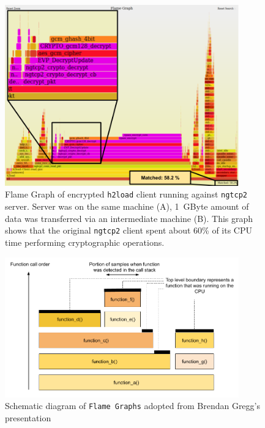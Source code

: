 \documentclass[12pt,a4paper]{report}
\begin{document}
    \begin{figure}[H]
    \centering
    \includegraphics[width=0.9\textwidth]{figs/zoomed_encrypted_flame_graph_1GByte_h2load.png}
    \caption[Flame Graph of \texttt{h2load} client running against \texttt{ngtcp2} server]{Flame Graph of encrypted \texttt{h2load} client running against \texttt{ngtcp2} server.
    Server was on the same machine (A), 1~GByte amount of data was transferred via an intermediate machine (B). This graph shows that the original \texttt{ngtcp2} client spent about 60\% of its CPU time performing cryptographic operations.} 
    \label{fig:perf_results_of_h2load}
    \end{figure}



    \begin{figure}[H]
    \centering
    \includegraphics[width=0.9\textwidth]{figs/Flame_Graphs_explanation.png}
    \caption[Schematic diagram of \texttt{Flame Graphs}]{Schematic diagram of \texttt{Flame Graphs} adopted from Brendan Gregg's presentation~\cite{USENIX_ATC2017_flamegraphs}}
    \label{fig:Flame_Graphs_explanation}
    \end{figure}
\end{document}
